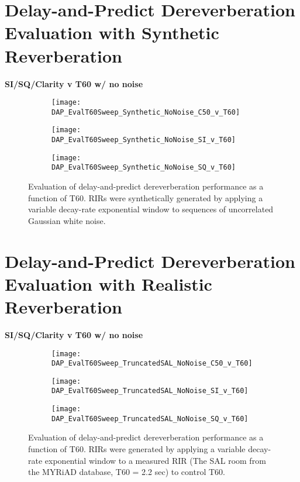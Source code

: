 \section{Delay-and-Predict Dereverberation Evaluation with Synthetic Reverberation}

\textbf{SI/SQ/Clarity v T60 w/ no noise}

\begin{figure}[H]
	\centering
	\begin{subfigure}[b]{0.47\textwidth}
		\centering
		\texttt{[image: DAP\_EvalT60Sweep\_Synthetic\_NoNoise\_C50\_v\_T60]}
	\end{subfigure}
	\begin{subfigure}[b]{0.92\textwidth}
		\centering
		\texttt{[image: DAP\_EvalT60Sweep\_Synthetic\_NoNoise\_SI\_v\_T60]}
	\end{subfigure}
	\begin{subfigure}[b]{0.92\textwidth}
		\centering
		\texttt{[image: DAP\_EvalT60Sweep\_Synthetic\_NoNoise\_SQ\_v\_T60]}
	\end{subfigure}
	\caption{Evaluation of delay-and-predict dereverberation performance as a function of T60. RIRs were synthetically generated by applying a variable decay-rate exponential window to sequences of uncorrelated Gaussian white noise.}
	\label{fig:DAP_EvalT60Sweep_Synthetic_NoNoise}
\end{figure}

\section{Delay-and-Predict Dereverberation Evaluation with Realistic Reverberation}

\textbf{SI/SQ/Clarity v T60 w/ no noise}

\begin{figure}[H]
	\centering
	\begin{subfigure}[b]{0.47\textwidth}
		\centering
		\texttt{[image: DAP\_EvalT60Sweep\_TruncatedSAL\_NoNoise\_C50\_v\_T60]}
	\end{subfigure}
	\begin{subfigure}[b]{0.92\textwidth}
		\centering
		\texttt{[image: DAP\_EvalT60Sweep\_TruncatedSAL\_NoNoise\_SI\_v\_T60]}
	\end{subfigure}
	\begin{subfigure}[b]{0.92\textwidth}
		\centering
		\texttt{[image: DAP\_EvalT60Sweep\_TruncatedSAL\_NoNoise\_SQ\_v\_T60]}
	\end{subfigure}
	\caption{Evaluation of delay-and-predict dereverberation performance as a function of T60. RIRs were generated by applying a variable decay-rate exponential window to a measured RIR (The SAL room from the MYRiAD database, T60 = 2.2 sec) to control T60.}
	\label{fig:DAP_EvalT60Sweep_TruncatedSAL_NoNoise}
\end{figure}



